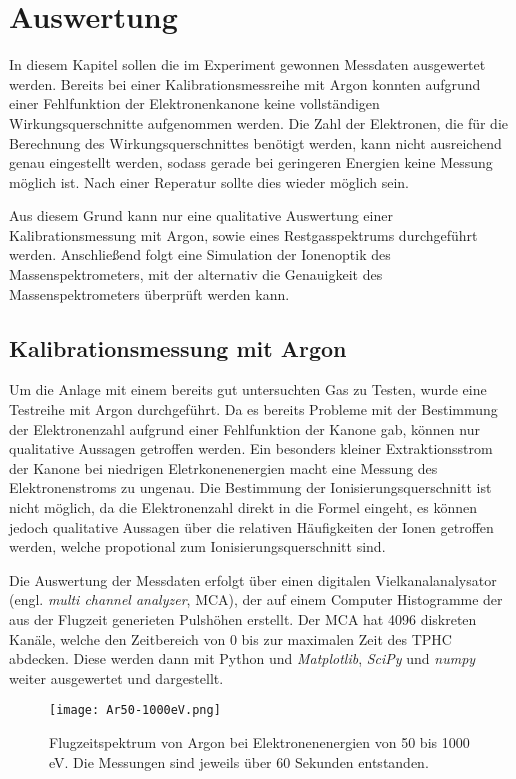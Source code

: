 \chapter{Auswertung}
\label{chap:Auswertung}
In diesem Kapitel sollen die im Experiment gewonnen Messdaten ausgewertet werden. Bereits bei einer Kalibrationsmessreihe mit Argon konnten aufgrund einer Fehlfunktion der Elektronenkanone keine vollständigen Wirkungsquerschnitte aufgenommen werden. Die Zahl der Elektronen, die für die Berechnung des Wirkungsquerschnittes benötigt werden, kann nicht ausreichend genau eingestellt werden, sodass gerade bei geringeren Energien keine Messung möglich ist. Nach einer Reperatur sollte dies wieder möglich sein. 

Aus diesem Grund kann nur eine qualitative Auswertung einer Kalibrationsmessung mit Argon, sowie eines Restgasspektrums durchgeführt werden. Anschließend folgt eine Simulation der Ionenoptik des Massenspektrometers, mit der alternativ die Genauigkeit des Massenspektrometers überprüft werden kann.

\section{Kalibrationsmessung mit Argon}
Um die Anlage mit einem bereits gut untersuchten Gas zu Testen, wurde eine Testreihe mit Argon durchgeführt. Da es bereits Probleme mit der Bestimmung der Elektronenzahl aufgrund einer Fehlfunktion der Kanone gab, können nur qualitative Aussagen getroffen werden. Ein besonders kleiner Extraktionsstrom der Kanone bei niedrigen Eletrkonenenergien macht eine Messung des Elektronenstroms zu ungenau. Die Bestimmung der Ionisierungsquerschnitt ist nicht möglich, da die Elektronenzahl direkt in die Formel eingeht, es können jedoch qualitative Aussagen über die relativen Häufigkeiten der Ionen getroffen werden, welche propotional zum Ionisierungsquerschnitt sind.

Die Auswertung der Messdaten erfolgt über einen digitalen Vielkanalanalysator (engl. \textit{multi channel analyzer}, MCA), der auf einem Computer Histogramme der aus der Flugzeit generieten Pulshöhen erstellt. Der MCA hat 4096 diskreten Kanäle, welche den Zeitbereich von 0 bis zur maximalen Zeit des TPHC abdecken. Diese werden dann mit Python und \textit{Matplotlib}, \textit{SciPy} und \textit{numpy} weiter ausgewertet und dargestellt. 

\begin{figure}
    \centering
    \hspace{-1.6cm}\texttt{[image: Ar50-1000eV.png]}
    \caption[Flugzeitspektrum von Argon bei Elektronenenergien von 50 bis 1000 eV]{Flugzeitspektrum von Argon bei Elektronenenergien von 50 bis 1000 eV. Die Messungen sind jeweils über 60 Sekunden entstanden.}
    \label{fig:ar}
\end{figure}

